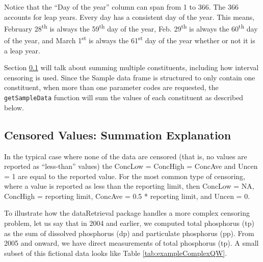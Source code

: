\documentclass[a4paper,11pt]{article}\usepackage[]{graphicx}\usepackage[]{color}
\begin{document}
Notice that the \enquote{Day of the year} column can span from 1 to 366. The 366 accounts for leap years. Every day has a consistent day of the year. This means, February 28\textsuperscript{th} is always the 59\textsuperscript{th} day of the year, Feb. 29\textsuperscript{th} is always the 60\textsuperscript{th} day of the year, and March 1\textsuperscript{st} is always the 61\textsuperscript{st} day of the year whether or not it is a leap year.

Section \ref{sec:cenValues} will talk about summing multiple constituents, including how interval censoring is used. Since the Sample data frame is structured to only contain one constituent, when more than one parameter codes are requested, the \texttt{getSampleData} function will sum the values of each constituent as described below.

\FloatBarrier


\subsection{Censored Values: Summation Explanation}
\label{sec:cenValues}
In the typical case where none of the data are censored (that is, no values are reported as \enquote{less-than} values) the ConcLow = ConcHigh = ConcAve and Uncen = 1 are equal to the reported value.  For the most common type of censoring, where a value is reported as less than the reporting limit, then ConcLow = NA, ConcHigh = reporting limit, ConcAve = 0.5 * reporting limit, and Uncen = 0.

To illustrate how the dataRetrieval package handles a more complex censoring problem, let us say that in 2004 and earlier, we computed total phosphorus (tp) as the sum of dissolved phosphorus (dp) and particulate phosphorus (pp). From 2005 and onward, we have direct measurements of total phosphorus (tp). A small subset of this fictional data looks like Table \ref{tab:exampleComplexQW}.
\end{document}
